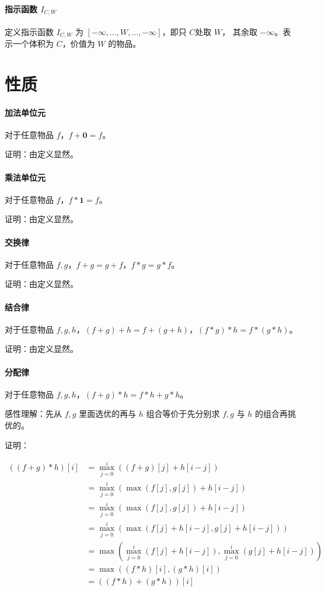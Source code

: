 \documentclass{article}
\begin{document}
\paragraph{指示函数 $I_{C,W}$}
定义指示函数 $I_{C,W}$ 为 $[-\infty,\ldots,W ,\ldots,-\infty ]$，即只 $C$处取 $W$， 其余取 $-\infty$。表示一个体积为 $C$，价值为 $W$ 的物品。


\section{性质}

\paragraph{加法单位元}
对于任意物品 $f$，$f + \textbf{0} = f$。

证明：由定义显然。
\paragraph{乘法单位元}
对于任意物品 $f$，$f * \textbf{1} = f$。

证明：由定义显然。
\paragraph{交换律}
对于任意物品 $f,g$，$f+g = g+f$，$f*g = g*f$。

证明：由定义显然。
\paragraph{结合律}
对于任意物品 $f,g,h$，$(f+g)+h = f+(g+h)$，$(f*g)*h = f*(g*h)$。

证明：由定义显然。

\paragraph{分配律}
对于任意物品 $f,g,h$，$(f+g)*h = f*h + g*h$。

感性理解：先从 $f,g$ 里面选优的再与 $h$ 组合等价于先分别求 $f,g$ 与 $h$ 的组合再挑优的。

证明：

\begin{align*}
    ((f+g)*h)[i] 
    &= \max_{j = 0}^i ((f+g)[j] + h[i-j])\\
    &= \max_{j = 0}^i (\max(f[j],g[j]) + h[i-j])\\
    &= \max_{j = 0}^i (\max(f[j],g[j]) + h[i-j])\\
    &= \max_{j = 0}^i (\max(f[j]+h[i-j],g[j]+h[i-j]))\\
    &= \max(\max_{j = 0}^i(f[j]+h[i-j]),\max_{j = 0}^i(g[j]+h[i-j]))\\
    &= \max((f*h)[i],(g*h)[i])\\
    &= ((f*h)+(g*h))[i]\\
\end{align*}
\end{document}

